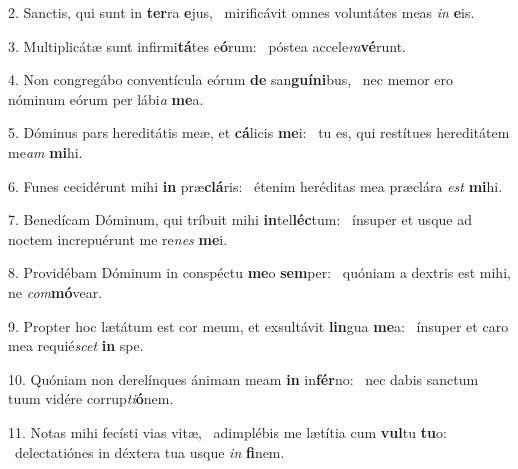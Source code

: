 2. Sanctis, qui sunt in \textbf{ter}ra \textbf{e}jus, \ast\  mirificávit omnes voluntátes meas \textit{in} \textbf{e}is.\

3. Multiplicátæ sunt infirmi\textbf{tá}tes e\textbf{ó}rum: \ast\  póstea accele\textit{ra}\textbf{vé}runt.\

4. Non congregábo conventícula eórum \textbf{de} san\textbf{guí}\textbf{ni}bus, \ast\  nec memor ero nóminum eórum per lábi\textit{a} \textbf{me}a.\

5. Dóminus pars hereditátis meæ, et \textbf{cá}licis \textbf{me}i: \ast\  tu es, qui restítues hereditátem me\textit{am} \textbf{mi}hi.\

6. Funes cecidérunt mihi \textbf{in} præ\textbf{clá}ris: \ast\  étenim heréditas mea præclára \textit{est} \textbf{mi}hi.\

7. Benedícam Dóminum, qui tríbuit mihi \textbf{in}tel\textbf{léc}tum: \ast\  ínsuper et usque ad noctem increpuérunt me re\textit{nes} \textbf{me}i.\

8. Providébam Dóminum in conspéctu \textbf{me}o \textbf{sem}per: \ast\  quóniam a dextris est mihi, ne \textit{com}\textbf{mó}vear.\

9. Propter hoc lætátum est cor meum, et exsultávit \textbf{lin}gua \textbf{me}a: \ast\  ínsuper et caro mea requié\textit{scet} \textbf{in} spe.\

10. Quóniam non derelínques ánimam meam \textbf{in} in\textbf{fér}no: \ast\  nec dabis sanctum tuum vidére corrup\textit{ti}\textbf{ó}nem.\

11. Notas mihi fecísti vias vitæ, \dag\  adimplébis me lætítia cum \textbf{vul}tu \textbf{tu}o: \ast\  delectatiónes in déxtera tua usque \textit{in} \textbf{fi}nem.\

